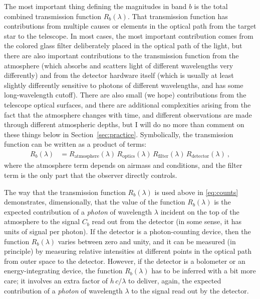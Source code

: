 \documentclass[10pt]{article}
\newcommand{\sectionname}{Section}
\newcommand{\secref}[1]{\sectionname~\ref{#1}}
\begin{document}
The most important thing defining the magnitudes in band $b$ is the total combined transmission function $R_b(\lambda)$.
That transmission function has contributions from multiple causes or elements in the optical path from the target star to the telescope.
In most cases, the most important contribution comes from the colored glass filter deliberately placed in the optical path of the light, but there are also important contributions to the transmission function from the atmosphere (which absorbs and scatters light of different wavelengths very differently) and from the detector hardware itself (which is usually at least slightly differently sensitive to photons of different wavelengths, and has some long-wavelength cutoff).
There are also small (we hope) contributions from the telescope optical surfaces,
and there are additional complexities arising from the fact that the atmosphere changes with time, and different observations are made through different atmospheric depths, but I will do no more than comment on these things below in \secref{sec:practice}.
Symbolically, the transmission function can be written as a product of terms:
\begin{align}
    R_b(\lambda) &= R_\text{atmosphere}(\lambda)\,R_\text{optics}(\lambda)\,R_\text{filter}(\lambda)\,R_\text{detector}(\lambda)~,
\end{align}
where the atmosphere term depends on airmass and conditions, and the filter term is the only part that the observer directly controls.

The way that the transmission function $R_b(\lambda)$ is used above in \eqref{eq:counts} demonstrates, dimensionally,
that the value of the function $R_b(\lambda)$ is the expected contribution of a \emph{photon} of wavelength
$\lambda$ incident on the top of the atmosphere to the signal $C_b$ read out from the detector (in some sense, it has units of signal per photon).
If the detector is a photon-counting device, then the function $R_b(\lambda)$ varies between zero and unity, and it can be measured (in principle) by measuring relative intensities at different points in the optical path from outer space to the detector.
However, if the detector is a bolometer or an energy-integrating device, the function $R_b(\lambda)$ has to be inferred
with a bit more care; it involves an extra factor of $h\,c/\lambda$ to deliver, again, the expected contribution of
a \emph{photon} of wavelength $\lambda$ to the signal read out by the detector.
\end{document}
